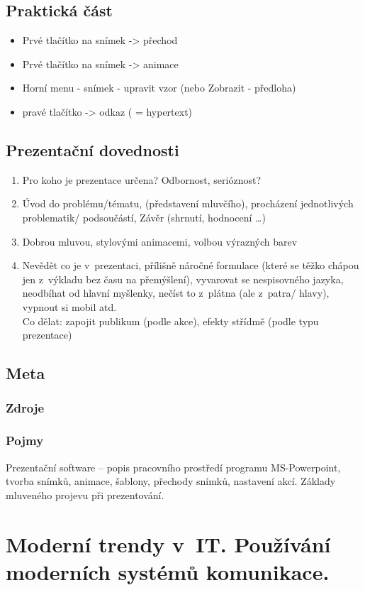 \documentclass[12pt]{article}
\begin{document}
\subsection{Praktická část}
\begin{itemize}
\item Prvé tlačítko na snímek -> přechod
\item Prvé tlačítko na snímek -> animace
\item Horní menu - snímek - upravit vzor (nebo Zobrazit - předloha)
\item pravé tlačítko -> odkaz ( = hypertext)
\end{itemize}
\subsection{Prezentační dovednosti}
\begin{enumerate}
\item Pro koho je prezentace určena? Odbornost, serióznost? 
\item Úvod do problému/tématu, (představení mluvčího), procházení jednotlivých problematik/ podsoučástí, Závěr (shrnutí, hodnocení \dots )
\item Dobrou mluvou, stylovými animacemi, volbou výrazných barev
\item Nevědět co je v~prezentaci, přílišně náročné formulace (které se těžko chápou jen z~výkladu bez času na přemýšlení), vyvarovat se nespisovného jazyka, neodbíhat od hlavní myšlenky, nečíst to z~plátna (ale z~patra/ hlavy), vypnout si mobil atd.\\
Co dělat: zapojit publikum (podle akce), efekty střídmě (podle typu prezentace)
\end{enumerate}
\subsection{Meta}
\subsubsection{Zdroje}
\subsubsection{Pojmy}
Prezentační software – popis pracovního prostředí programu MS-Powerpoint, tvorba snímků, animace, šablony, přechody snímků, nastavení akcí. Základy mluveného projevu při prezentování.

\section{Moderní trendy v~IT. Používání moderních systémů komunikace.}
\end{document}
